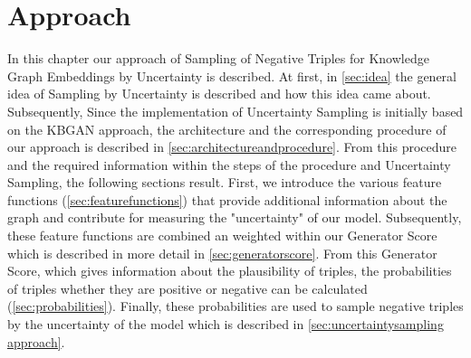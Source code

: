 \chapter{Approach}
\label{ch:approach}

In this chapter our approach of Sampling of Negative Triples for Knowledge Graph Embeddings by Uncertainty is described.
At first, in \autoref{sec:idea} the general idea of Sampling by Uncertainty is described and how this idea came about.
Subsequently, 
Since the implementation of Uncertainty Sampling is initially based on the \ac{KBGAN} approach, the architecture and the corresponding procedure of our approach is described in \autoref{sec:architectureandprocedure}.
From this procedure and the required information within the steps of the procedure and Uncertainty Sampling, the following sections result.
First, we introduce the various feature functions (\autoref{sec:featurefunctions}) that provide additional information about the graph and contribute for measuring the "uncertainty" of our model.
Subsequently, these feature functions are combined an weighted within our Generator Score which is described in more detail in \autoref{sec:generatorscore}.
From this Generator Score, which gives information about the plausibility of triples, the probabilities of triples whether they are positive or negative can be calculated (\autoref{sec:probabilities}). 
Finally, these probabilities are used to sample negative triples by the uncertainty of the model which is described in \autoref{sec:uncertaintysampling approach}.





































